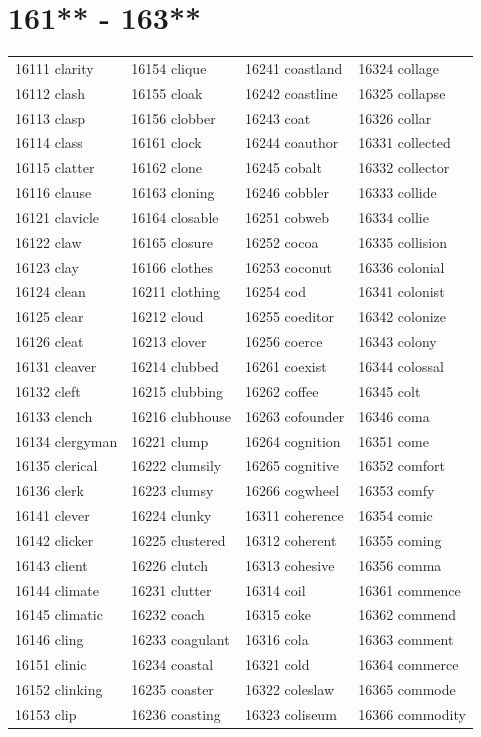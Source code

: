 \documentclass[10pt, oneside]{book}
\begin{document}
\begin{table}
	\centering
	\section*{161** - 163**}
	\begin{tabular}{l l l l}
16111 clarity &16154 clique &16241 coastland &16324 collage\\
16112 clash &16155 cloak &16242 coastline &16325 collapse\\
16113 clasp &16156 clobber &16243 coat &16326 collar\\
16114 class &16161 clock &16244 coauthor &16331 collected\\
16115 clatter &16162 clone &16245 cobalt &16332 collector\\
16116 clause &16163 cloning &16246 cobbler &16333 collide\\
16121 clavicle &16164 closable &16251 cobweb &16334 collie\\
16122 claw &16165 closure &16252 cocoa &16335 collision\\
16123 clay &16166 clothes &16253 coconut &16336 colonial\\
16124 clean &16211 clothing &16254 cod &16341 colonist\\
16125 clear &16212 cloud &16255 coeditor &16342 colonize\\
16126 cleat &16213 clover &16256 coerce &16343 colony\\
16131 cleaver &16214 clubbed &16261 coexist &16344 colossal\\
16132 cleft &16215 clubbing &16262 coffee &16345 colt\\
16133 clench &16216 clubhouse &16263 cofounder &16346 coma\\
16134 clergyman &16221 clump &16264 cognition &16351 come\\
16135 clerical &16222 clumsily &16265 cognitive &16352 comfort\\
16136 clerk &16223 clumsy &16266 cogwheel &16353 comfy\\
16141 clever &16224 clunky &16311 coherence &16354 comic\\
16142 clicker &16225 clustered &16312 coherent &16355 coming\\
16143 client &16226 clutch &16313 cohesive &16356 comma\\
16144 climate &16231 clutter &16314 coil &16361 commence\\
16145 climatic &16232 coach &16315 coke &16362 commend\\
16146 cling &16233 coagulant &16316 cola &16363 comment\\
16151 clinic &16234 coastal &16321 cold &16364 commerce\\
16152 clinking &16235 coaster &16322 coleslaw &16365 commode\\
16153 clip &16236 coasting &16323 coliseum &16366 commodity\\
	\end{tabular}
 \end{table}
\clearpage
\end{document}
